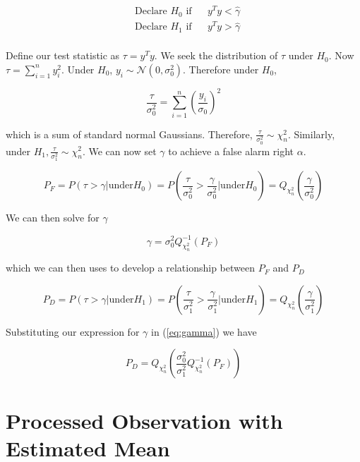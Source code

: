 \documentclass[english]{article}
\begin{document}
\begin{equation}
\begin{aligned}
&\text{Declare } H_0 \text{ if}
&& y^Ty < \hat{\gamma}\\
& \text{Declare } H_1 \text{ if}
&& y^Ty > \hat{\gamma}\\
\end{aligned}
\end{equation}

Define our test statistic as $\tau=y^Ty$. We seek the distribution of $\tau$ under $H_0$. Now $\tau=\sum_{i=1}^ny_i^2$. Under $H_0$, $y_i\sim\mathcal{N}(0,\sigma_0^2)$. Therefore under $H_0$,

\begin{equation}
\frac{\tau}{\sigma_0^2}=\sum_{i=1}^n\left(\frac{y_i}{\sigma_0}\right)^2
\end{equation}

which is a sum of standard normal Gaussians. Therefore, $\frac{\tau}{\sigma_0^2}\sim\chi_n^2$. Similarly, under $H_1, \frac{\tau}{\sigma_1^2}\sim\chi_n^2$. We can now set $\gamma$ to achieve a false alarm right $\alpha$.

\begin{equation}
P_F=P(\tau>\gamma | \text{under} H_0) = P(\frac{\tau}{\sigma_0^2}>\frac{\gamma}{\sigma_0^2} | \text{under} H_0) = Q_{\chi_n^2}(\frac{\gamma}{\sigma_0^2})
\end{equation}

We can then solve for $\gamma$

\begin{equation}\label{eq:gamma}
\gamma = \sigma_0^2Q^{-1}_{\chi_n^2}\left(P_F\right)
\end{equation}

which we can then uses to develop a relationship between $P_F$ and $P_D$

\begin{equation}
P_D=P(\tau>\gamma | \text{under} H_1) = P(\frac{\tau}{\sigma_1^2}>\frac{\gamma}{\sigma_1^2} | \text{under} H_1) = Q_{\chi_n^2}\left(\frac{\gamma}{\sigma_1^2}\right)
\end{equation}

Substituting our expression for $\gamma$ in (\ref{eq:gamma}) we have

\begin{equation}
P_D=Q_{\chi_n^2}\left(\frac{\sigma_0^2}{\sigma_1^2}Q^{-1}_{\chi_n^2}\left(P_F\right)\right)
\end{equation}

\section*{Processed Observation with Estimated Mean}
\end{document}

